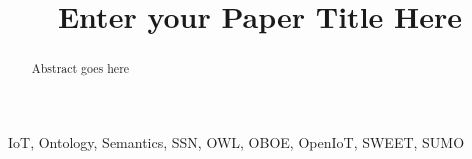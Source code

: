 \documentclass[conference]{IEEEtran}
\begin{document}
	\title{Enter your Paper Title Here}
	\author
	{
	}
	\maketitle
	\begin{abstract}
		Abstract goes here
	\end{abstract}
	\begin {IEEEkeywords}
		IoT, Ontology, Semantics,  SSN, OWL, OBOE, OpenIoT, SWEET, SUMO
	\end{IEEEkeywords}
	
	
	
	
%
%

%
%
%
%
%
%
%
%
%
%
%
%
%
%
%


	
	
\end{document}
